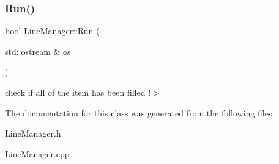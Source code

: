 \subsubsection{\texorpdfstring{Run()}{Run()}}
{\footnotesize\ttfamily bool Line\+Manager\+::\+Run (\begin{DoxyParamCaption}\item[{std\+::ostream \&}]{os }\end{DoxyParamCaption})}

check if all of the item has been filled !$>$ 

The documentation for this class was generated from the following files\+:\begin{DoxyCompactItemize}
\item 
Line\+Manager.\+h\item 
Line\+Manager.\+cpp\end{DoxyCompactItemize}
